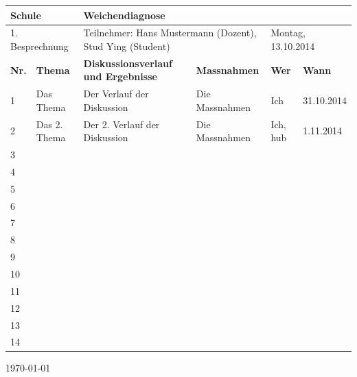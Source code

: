 \documentclass[12pt,a4paper,landscape,final,oneside,notitlepage]{article}
\begin{document}
\pagestyle{empty}

\newcommand{\teilnehmer}{Hans Mustermann (Dozent), Stud Ying (Student)} %
\newcommand{\nrb}{1.}                   %
\newcommand{\titel}{Weichendiagnose}    %
\newcommand{\datum}{Montag, 13.10.2014} %
\newcommand{\institut}{Schule}          %

\def\arraystretch{1.5}
\begin{tabularx}{\textwidth}{|l|p{9em}|X|p{15em}|l|l|}
	\hline
	\multicolumn{2}{|l|}{ {\LARGE  \textbf{\institut}} } & \multicolumn{4}{l|}{ {\LARGE \textbf{\titel}}}  \\ \hline
	\multicolumn{2}{|l|}{ \nrb ~ Besprechnung } & \multicolumn{2}{l|}{ Teilnehmer: \teilnehmer } &  \multicolumn{2}{l|}{\datum}   \\ \hline
	\textbf{Nr. }& \textbf{Thema} & \textbf{Diskussionsverlauf und Ergebnisse} & \multicolumn{1}{l|}{ \textbf{Massnahmen} } & \textbf{Wer} & \textbf{Wann} \\ \hline\hline

 
1 & Das Thema & Der Verlauf der Diskussion & Die Massnahmen & Ich & 31.10.2014 \\ [.5em] \hline
2 & Das 2. Thema & Der 2. Verlauf der Diskussion & Die Massnahmen & Ich, hub & 1.11.2014 \\ [.5em] \hline
3 & & & & & \\ [.5em] \hline
4 & & & & & \\ [.5em] \hline
5 & & & & & \\ [.5em] \hline
6 & & & & & \\ [.5em] \hline
7 & & & & & \\ [.5em] \hline
8 & & & & & \\ [.5em] \hline
9 & & & & & \\ [.5em] \hline
10 & & & & & \\ [.5em] \hline
11 & & & & & \\ [.5em] \hline
12 & & & & & \\ [.5em] \hline
13 & & & & & \\ [.5em] \hline
14 & & & & & \\ [.5em] \hline

\end{tabularx}%

\par \today \par
\end{document}
